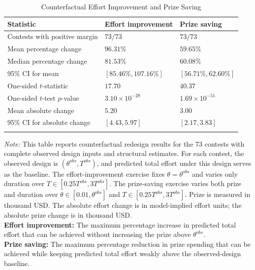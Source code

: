 \documentclass[mnsc]{informs3}
\begin{document}
\begin{table}[htbp]
\centering
\caption{Counterfactual Effort Improvement and Prize Saving}
\label{tab-counterfactual-policy}
\begin{tabularx}{\textwidth}{lYY}
\toprule
\textbf{Statistic} & \textbf{Effort improvement} & \textbf{Prize saving} \\
\midrule
Contests with positive margin & $73/73$ & $73/73$ \\
Mean percentage change & $96.31\%$ & $59.65\%$ \\
Median percentage change & $81.53\%$ & $60.08\%$ \\
95\% CI for mean & $[85.46\%,107.16\%]$ & $[56.71\%,62.60\%]$ \\
One-sided $t$-statistic & $17.70$ & $40.37$ \\
One-sided $t$-test $p$-value & $3.10\times10^{-28}$ & $1.69\times10^{-51}$ \\
Mean absolute change & $5.20$ & $3.00$ \\
95\% CI for absolute change & $[4.43,5.97]$ & $[2.17,3.83]$ \\
\bottomrule
\addlinespace[0.5ex]
\end{tabularx}
\begin{minipage}{\textwidth}
{\footnotesize
\textit{Note:}
This table reports counterfactual redesign results for the 73 contests with complete observed design inputs and structural estimates.
For each contest, the observed design is $(\theta^{obs},T^{obs})$, and predicted total effort under this design serves as the baseline.
The effort-improvement exercise fixes $\theta=\theta^{obs}$ and varies only duration over $T\in[0.25T^{obs},3T^{obs}]$.
The prize-saving exercise varies both prize and duration over $\theta\in[0.01,\theta^{obs}]$ and $T\in[0.25T^{obs},3T^{obs}]$.
Prize is measured in thousand USD. The absolute effort change is in model-implied effort units; the absolute prize change is in thousand USD.
\\
\textbf{Effort improvement:} The maximum percentage increase in predicted total effort that can be achieved without increasing the prize above $\theta^{obs}$.
\\
\textbf{Prize saving:} The maximum percentage reduction in prize spending that can be achieved while keeping predicted total effort weakly above the observed-design baseline.
}
\end{minipage}
\end{table}
\end{document}
